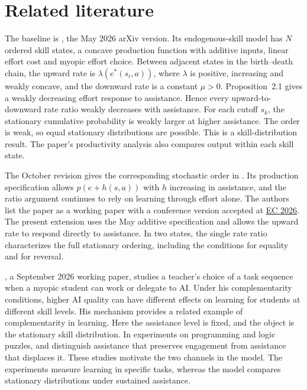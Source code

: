 \documentclass[11pt]{article}
\theoremstyle{definition}
\begin{document}
\section{Related literature}\label{sec:literature}
The baseline is \citet[Proposition~3.5, p.~8, and Appendix~A.4]{aouad2026paradoxes},
the May 2026 arXiv version. Its endogenous-skill model has $N$ ordered
skill states, a concave production function with additive inputs, linear
effort cost and myopic effort choice. Between adjacent states in the
birth--death chain, the upward rate is $\lambda(e^*(s_i,a))$, where
$\lambda$ is positive, increasing and weakly concave, and the downward
rate is a constant $\mu>0$. Proposition~2.1 gives a weakly decreasing
effort response to assistance. Hence every upward-to-downward rate ratio
weakly decreases with assistance. For each cutoff $s_k$, the stationary
cumulative probability is weakly larger at higher assistance. The order
is weak, so equal stationary distributions are possible. This is a
skill-distribution result. The paper's productivity analysis also
compares output within each skill state.

The October revision gives the corresponding stochastic order in
\citet[Proposition~3.3, p.~10, and Appendix~B.3]{aouad2026paradoxesv2}.
Its production specification allows $p(e+h(s,a))$ with $h$ increasing
in assistance, and the ratio argument continues to rely on learning
through effort alone. The authors list the paper as a working paper with
a conference version accepted at \href{https://ec26.sigecom.org/program/accepted-papers/}
{EC 2026}. The present extension uses
the May additive specification and allows the upward rate to respond
directly to assistance. In two states, the single rate ratio characterizes
the full stationary ordering, including the conditions for equality and
for reversal.

\citet{davies2026course}, a September 2026 working paper, studies a teacher's
choice of a task sequence when a myopic student can work or delegate to AI.
Under his complementarity conditions, higher AI quality can have different
effects on learning for students at different skill levels. His mechanism
provides a related example of complementarity in learning. Here the
assistance level is fixed, and the object is the stationary skill
distribution. In experiments on programming and logic puzzles,
\citet{shen2026skill} and \citet{wu2026assistance} distinguish assistance
that preserves engagement from assistance that displaces it. These
studies motivate the two channels in the model. The experiments measure
learning in specific tasks, whereas the model compares stationary
distributions under sustained assistance.
\end{document}
